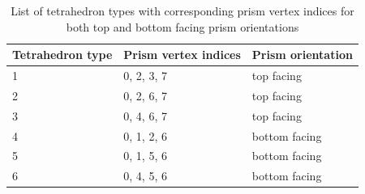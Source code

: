 \documentclass[./main.tex]{subfiles}
\begin{document}
\begin{centering}
	\begin{table}[H]
		\caption{List of tetrahedron types with corresponding prism vertex indices for both top and bottom facing prism orientations}
		\begin{tabular}{|l|l|l|}
			\hline
			 \rowcolor{lightgray}
			Tetrahedron type&Prism vertex indices&Prism orientation\\
			\hline
			1&0, 2, 3, 7&top facing\\			
			\hline
			2&0, 2, 6, 7&top facing\\		
			\hline
			3&0, 4, 6, 7&top facing\\			
			\hline
			4&0, 1, 2, 6&bottom facing\\			
			\hline
			5&0, 1, 5, 6&bottom facing\\			
			\hline
			6&0, 4, 5, 6&bottom facing\\			
			\hline
		\end{tabular}
		\label{tab:tetrahedron_indices_for_prisms}	
	\end{table}
\end{centering}
\end{document}
